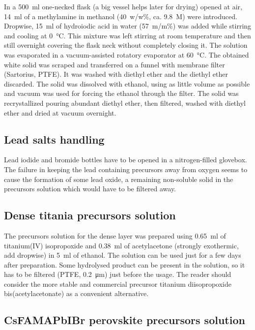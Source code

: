 		In a \SI{500}{\ml} one-necked flask (a big vessel helps later for drying) opened at air, \SI{14}{\ml} of a methylamine in methanol (40~w/w\%, ca. 9.8~M) were introduced. Dropwise, \SI{15}{\ml} of hydroiodic acid in water (57~m/m\%) was added while stirring and cooling at \SI{0}{\celsius}. This mixture was left stirring at room temperature and then still overnight covering the flask neck without completely closing it.
		The solution was evaporated in a vacuum-assisted rotatory evaporator at \SI{60}{\celsius}.
		The obtained white solid was scraped and transferred on a funnel with membrane filter (Sartorius, PTFE). It was washed with diethyl ether and the diethyl ether discarded. The solid was dissolved with ethanol, using as little volume as possible and vacuum was used for forcing the ethanol through the filter. The solid was recrystallized pouring abundant diethyl ether, then filtered, washed with diethyl ether and dried at vacuum overnight.

	\subsection{Lead salts handling}
		
		 Lead iodide and bromide bottles have to be opened in a nitrogen-filled glovebox. The failure in keeping the lead containing precursors away from oxygen seems to cause the formation of some lead oxide, a remaining non-soluble solid in the precursors solution which would have to be filtered away.
		 
	\subsection{Dense titania precursors solution}\label{dense-tio2}
		
		The precursors solution for the dense \TiOtwo layer was prepared using \SI{0.65}{\ml} of titanium(IV) isopropoxide and
		\SI{0.38}{\ml} of acetylacetone (strongly exothermic, add dropwise) in \SI{5}{\ml} of ethanol. The solution can be used just for a few days after preparation. Some hydrolysed product can be present in the solution, so it has to be filtered (PTFE, \SI{0.2}{\um}) just before the usage. The reader should consider the more stable and commercial precursor titanium diisopropoxide bis(acetylacetonate) as a convenient alternative.

	\subsection{CsFAMAPbIBr perovskite precursors solution}
		
